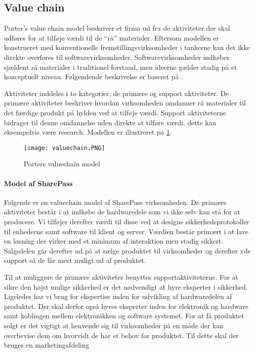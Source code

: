 \subsection{Value chain}


Porter's value chain model beskriver et firma ud fra de aktiviteter der skal udføres for at tilføje værdi til de ``rå'' materialer.
Eftersom modellen er konstrueret med konventionelle fremstillingsvirksomheder i tankerne kan det ikke direkte overføres til softwarevirksomheder.
Softwarevirksomheder indkøber sjældent rå materialer i traditionel forstand, men ideerne gælder stadig på et konceptuelt niveau.
Følgendende beskrivelse er baseret på \citet[p.~12]{rose2012software}.


Aktiviteter inddeles i to kategorier, de primære og support aktiviteter.
De primære aktiviteter beskriver hvordan virksomheden omdanner rå materialer til det færdige produkt på hylden ved at tilføje værdi.
Support aktiviteterne bidrager til denne omdannelse uden direkte at tilføre værdi, dette kan eksempelvis være research.
Modellen er illustreret på  \cref{valuechain}.

\begin{figure}[H]
	\texttt{[image: valuechain.PNG]}
	\caption{Porters valuechain model}
	\label{valuechain}
\end{figure}

\paragraph{Model af SharePass}
Følgende er en valuechain model af SharePass virksomheden.
De primære aktiviteter består i at indkøbe de hardwaredele som vi ikke selv kan stå for at producere.
Vi tilføjer derefter værdi til disse ved at designe sikkerhedsprotokoller til enhederne samt software til klient og server.
Værdien består primært i at lave en løsning der virker med et minimum af interaktion men stadig sikkert.
Salgsdelen går derefter ud på at sælge produktet til virksomheder og derefter yde support så de får mest muligt ud af produktet.

Til at muliggøre de primære aktiviteter benyttes supportaktiviteterne.
For at sikre den højst mulige sikkerhed er det nødvendigt at hyre eksperter i sikkerhed.
Ligeledes har vi brug for ekspertise inden for udvikling af hardwaredelen af produktet.
Der skal derfor også hyres eksperter inden for elektronik og hardware samt koblingen mellem elektronikken og software systemet.
For at få produktet solgt er det vigtigt at henvende sig til virksomheder på en måde der kan overbevise dem om hvorvidt de har et behov for produktet.
Til dette skal der bruges en marketingafdeling

